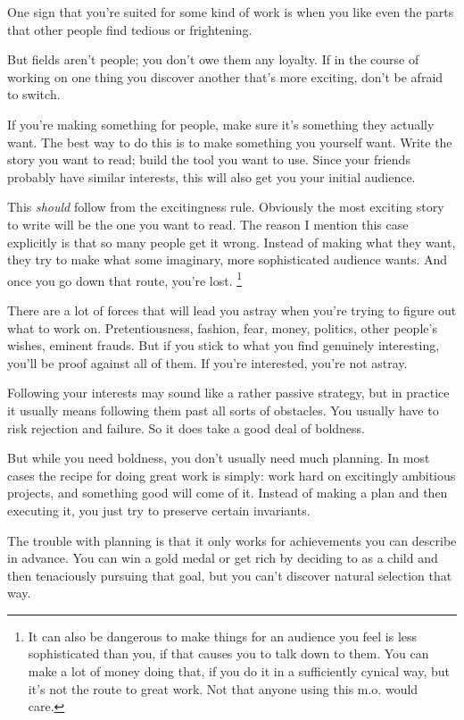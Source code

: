 \documentclass[12pt]{book}
\begin{document}
One sign that you're suited for some kind of work is when you like even
the parts that other people find tedious or frightening.

But fields aren't people; you don't owe them any loyalty. If in the
course of working on one thing you discover another that's more
exciting, don't be afraid to switch.

If you're making something for people, make sure it's something they
actually want. The best way to do this is to make something you yourself
want. Write the story you want to read; build the tool you want to use.
Since your friends probably have similar interests, this will also get
you your initial audience.

This \emph{should} follow from the excitingness rule. Obviously the most
exciting story to write will be the one you want to read. The reason I
mention this case explicitly is that so many people get it wrong.
Instead of making what they want, they try to make what some imaginary,
more sophisticated audience wants. And once you go down that route,
you're lost. \footnote{It can also be dangerous to make things for an audience you feel
is less sophisticated than you, if that causes you to talk down to them.
You can make a lot of money doing that, if you do it in a sufficiently
cynical way, but it's not the route to great work. Not that anyone using
this m.o. would care.}

There are a lot of forces that will lead you astray when you're trying
to figure out what to work on. Pretentiousness, fashion, fear, money,
politics, other people's wishes, eminent frauds. But if you stick to
what you find genuinely interesting, you'll be proof against all of
them. If you're interested, you're not astray.

Following your interests may sound like a rather passive strategy, but
in practice it usually means following them past all sorts of obstacles.
You usually have to risk rejection and failure. So it does take a good
deal of boldness.

But while you need boldness, you don't usually need much planning. In
most cases the recipe for doing great work is simply: work hard on
excitingly ambitious projects, and something good will come of it.
Instead of making a plan and then executing it, you just try to preserve
certain invariants.

The trouble with planning is that it only works for achievements you can
describe in advance. You can win a gold medal or get rich by deciding to
as a child and then tenaciously pursuing that goal, but you can't
discover natural selection that way.
\end{document}
